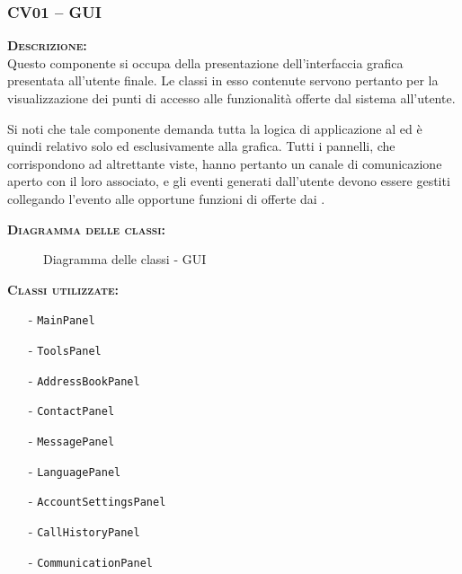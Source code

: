 \subsubsection{CV01 -- GUI}\label{sec:cv01}
\begin{description}
	\item{\scshape\bfseries Descrizione:}\\
Questo componente si occupa della presentazione dell'interfaccia grafica presentata all'utente finale. Le classi in esso contenute servono pertanto per la visualizzazione dei punti di accesso alle funzionalità offerte dal sistema all'utente.

Si noti che tale componente demanda tutta la logica di applicazione al  ed è quindi relativo solo ed esclusivamente alla grafica. Tutti i pannelli, che corrispondono ad altrettante viste, hanno pertanto un canale di comunicazione aperto con il  loro associato, e gli eventi generati dall'utente devono essere gestiti collegando l'evento alle opportune funzioni di  offerte dai .

	\item{\scshape\bfseries Diagramma delle classi:}
  \begin{figure}[H]
    \centering
    \caption{Diagramma delle classi - GUI}\label{fig:gui}
  \end{figure}

	\item{\scshape\bfseries Classi utilizzate:} 
	\begin{itemize}[noitemsep,nolistsep]
		\item[-] \texttt{MainPanel}
		\item[-] \texttt{ToolsPanel}
		\item[-] \texttt{AddressBookPanel}
		\item[-] \texttt{ContactPanel}
		\item[-] \texttt{MessagePanel}
		\item[-] \texttt{LanguagePanel}
		\item[-] \texttt{AccountSettingsPanel}
		\item[-] \texttt{CallHistoryPanel}
		\item[-] \texttt{CommunicationPanel}
	\end{itemize}  
\end{description}

